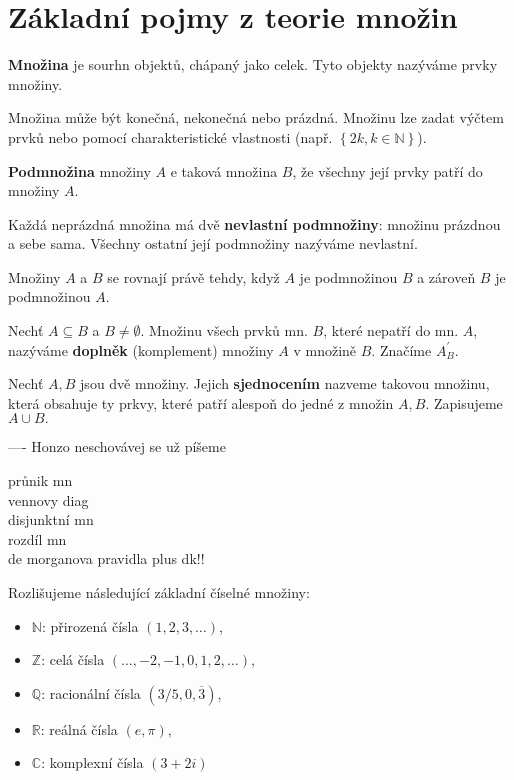 \section{Základní pojmy z teorie množin}
\begin{definition}
  \textbf{Množina} je sourhn objektů, chápaný jako celek. Tyto objekty nazýváme prvky množiny.
\end{definition}

Množina může být konečná, nekonečná nebo prázdná. Množinu lze zadat výčtem prvků nebo pomocí charakteristické vlastnosti (např. $\left \{ 2k, k \in \mathbb{N}\right\}$).

\begin{definition}
  \textbf{Podmnožina} množiny $A$ e taková množina $B$, že všechny její prvky patří do množiny $A$.
\end{definition}

Každá neprázdná množina má dvě \textbf{nevlastní podmnožiny}: množinu prázdnou a sebe sama. Všechny ostatní její podmnožiny nazýváme nevlastní.

\begin{definition}
  Množiny $A$ a $B$ se rovnají právě tehdy, když $A$ je podmnožinou $B$ a zároveň $B$ je podmnožinou $A$.
\end{definition}

\begin{definition}
  Nechť $A \subseteq B$ a $B\neq \emptyset$. Množinu všech prvků mn. $B$, které nepatří do mn. $A$, nazýváme \textbf{doplněk} (komplement) množiny $A$ v množině $B$. Značíme $A_B^\prime.$
\end{definition}

\begin{definition}
  Nechť $A, B$ jsou dvě množiny. Jejich \textbf{sjednocením} nazveme takovou množinu, která obsahuje ty prkvy, které patří alespoň do jedné z množin $A, B$. Zapisujeme $A \cup B.$
\end{definition}

----
Honzo neschovávej se už píšeme


průnik mn\\
vennovy diag \\
disjunktní mn\\
rozdíl mn\\
de morganova pravidla plus dk!!\\

\begin{pozn}
  Rozlišujeme následující základní číselné množiny:
  \begin{itemize}
    \item $\mathbb{N}$: přirozená čísla $(1, 2, 3, \dots)$,
    \item $\mathbb{Z}$: celá čísla $(\dots, -2, -1, 0, 1, 2, \dots)$,
    \item $\mathbb{Q}$: racionální čísla $(3/5, 0,\overline{3})$,
    \item $\mathbb{R}$: reálná čísla $(e, \pi)$,
    \item $\mathbb{C}$: komplexní čísla $(3+2i)$
  \end{itemize}
\end{pozn}

